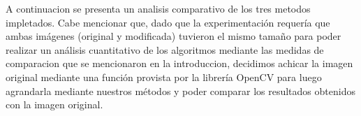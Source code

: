 A continuacion se presenta un analisis comparativo de los tres metodos impletados.
Cabe mencionar que, dado que la experimentación requería que ambas imágenes (original y modificada) tuvieron el mismo tamaño para poder realizar un análisis cuantitativo de los algoritmos mediante las medidas de comparacion que se mencionaron en la introduccion, decidimos achicar la imagen original mediante una función provista por la librería OpenCV para luego agrandarla mediante nuestros métodos y poder comparar los resultados obtenidos con la imagen original.